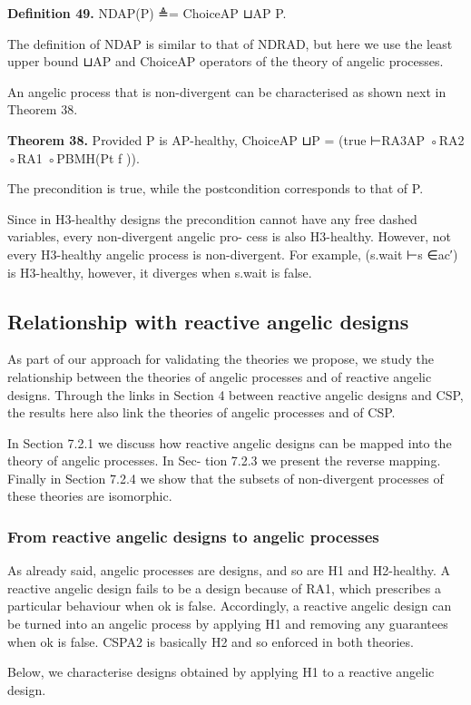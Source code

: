 \documentclass[11pt]{article}
\begin{document}
\noindent\textbf{Definition 49.} NDAP(P) ≜= ChoiceAP ⊔AP P.


The definition of NDAP is similar to that of NDRAD, but here we use the least upper bound ⊔AP and ChoiceAP operators of the theory of angelic processes.

An angelic process that is non-divergent can be characterised as shown next in Theorem 38.

\noindent\textbf{Theorem 38.} Provided P is AP-healthy, ChoiceAP ⊔P = (true ⊢RA3AP ◦RA2 ◦RA1 ◦PBMH(Pt f )).


The precondition is true, while the postcondition corresponds to that of P.

Since in H3-healthy designs the precondition cannot have any free dashed variables, every non-divergent angelic pro- cess is also H3-healthy. However, not every H3-healthy angelic process is non-divergent. For example, (s.wait ⊢s ∈ac′) is H3-healthy, however, it diverges when s.wait is false.

\subsection{Relationship with reactive angelic designs}
As part of our approach for validating the theories we propose, we study the relationship between the theories of angelic processes and of reactive angelic designs. Through the links in Section 4 between reactive angelic designs and CSP, the results here also link the theories of angelic processes and of CSP.

In Section 7.2.1 we discuss how reactive angelic designs can be mapped into the theory of angelic processes. In Sec- tion 7.2.3 we present the reverse mapping. Finally in Section 7.2.4 we show that the subsets of non-divergent processes of these theories are isomorphic.

\subsubsection{From reactive angelic designs to angelic processes}
As already said, angelic processes are designs, and so are H1 and H2-healthy. A reactive angelic design fails to be a design because of RA1, which prescribes a particular behaviour when ok is false. Accordingly, a reactive angelic design can be turned into an angelic process by applying H1 and removing any guarantees when ok is false. CSPA2 is basically H2 and so enforced in both theories.

Below, we characterise designs obtained by applying H1 to a reactive angelic design.
\end{document}
